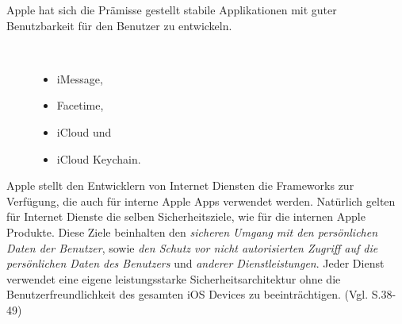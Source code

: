 Apple hat sich die Prämisse gestellt stabile Applikationen mit guter Benutzbarkeit für den Benutzer zu entwickeln. 
\begin{description}
    \item[\parbox{\textwidth} {Beispiele für solche internen iOS Apps sind }]~\par
    \begin{itemize}
       \item iMessage,
       \item Facetime,
       \item iCloud und 
       \item iCloud Keychain.
    \end{itemize}
\end{description} 

Apple stellt den Entwicklern von Internet Diensten die Frameworks zur Verfügung, die auch für interne Apple Apps verwendet werden. Natürlich gelten für Internet Dienste die selben Sicherheitsziele, wie für die internen Apple Produkte. Diese Ziele beinhalten den \textit{\glqq sicheren Umgang mit den persönlichen Daten der Benutzer\grqq{}}, sowie \textit{\glqq den Schutz vor nicht autorisierten Zugriff auf die persönlichen Daten des Benutzers\grqq{}} und \textit{\glqq anderer Dienstleistungen\grqq{}}. Jeder Dienst verwendet eine eigene leistungsstarke Sicherheitsarchitektur ohne die Benutzerfreundlichkeit des gesamten iOS Devices zu beeinträchtigen. (Vgl. \cite{Apple[4]} S.38-49)

